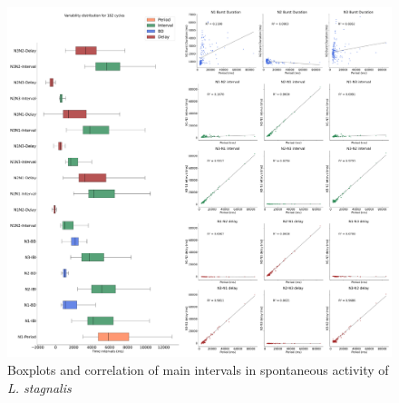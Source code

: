 \begin{figure}[bth!]
	\centering
	\includegraphics[width=\textwidth]{img/invariants/prep1_3 intervals panel.pdf}
	\caption{Boxplots and correlation of main intervals in spontaneous activity of \textit{L. stagnalis}}
	\label{fig:prep1 invariants}
\end{figure}



